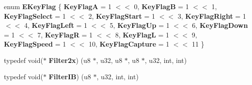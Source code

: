 \begin{DoxyCompactItemize}
enum {\bfseries E\+Key\+Flag} \{ \newline
{\bfseries Key\+FlagA} = 1 $<$$<$ 0, 
{\bfseries Key\+FlagB} = 1 $<$$<$ 1, 
{\bfseries Key\+Flag\+Select} = 1 $<$$<$ 2, 
{\bfseries Key\+Flag\+Start} = 1 $<$$<$ 3, 
\newline
{\bfseries Key\+Flag\+Right} = 1 $<$$<$ 4, 
{\bfseries Key\+Flag\+Left} = 1 $<$$<$ 5, 
{\bfseries Key\+Flag\+Up} = 1 $<$$<$ 6, 
{\bfseries Key\+Flag\+Down} = 1 $<$$<$ 7, 
\newline
{\bfseries Key\+FlagR} = 1 $<$$<$ 8, 
{\bfseries Key\+FlagL} = 1 $<$$<$ 9, 
{\bfseries Key\+Flag\+Speed} = 1 $<$$<$ 10, 
{\bfseries Key\+Flag\+Capture} = 1 $<$$<$ 11
 \}
\item 
\mbox{\label{class_v_b_a_accd36b6c101a516c50cf8288976739c4}} 
typedef void($\ast$ {\bfseries Filter2x}) (u8 $\ast$, u32, u8 $\ast$, u8 $\ast$, u32, int, int)
\item 
\mbox{\label{class_v_b_a_a3269ee707f37ad255f2b7b0f20921158}} 
typedef void($\ast$ {\bfseries Filter\+IB}) (u8 $\ast$, u32, int, int)
\end{DoxyCompactItemize}
